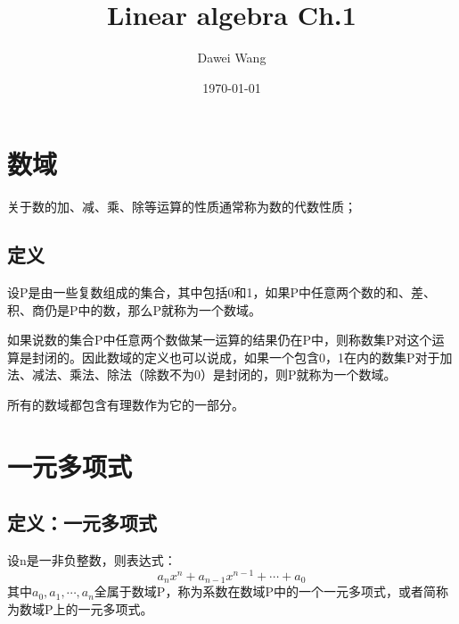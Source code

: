 \documentclass{article}%
\title{Linear algebra Ch.1}
\author{Dawei Wang}
\date{\today}
\begin{document}
	\maketitle

	
\section{数域}
关于数的加、减、乘、除等运算的性质通常称为数的代数性质；
\subsection{定义}
设P是由一些复数组成的集合，其中包括0和1，如果P中任意两个数的和、差、积、商仍是P中的数，那么P就称为一个数域。
\\ \hspace*{\fill} 

如果说数的集合P中任意两个数做某一运算的结果仍在P中，则称数集P对这个运算是封闭的。因此数域的定义也可以说成，如果一个包含0，1在内的数集P对于加法、减法、乘法、除法（除数不为0）是封闭的，则P就称为一个数域。
\\ \hspace*{\fill} 

所有的数域都包含有理数作为它的一部分。

\section{一元多项式}
\subsection{定义：一元多项式}
设n是一非负整数，则表达式：
\begin{equation*}
	a_nx^n+a_{n-1}x^{n-1}+\cdots+a_0
\end{equation*}
其中\(a_0,a_1,\cdots,a_n\)全属于数域P，称为系数在数域P中的一个一元多项式，或者简称为数域P上的一元多项式。
\end{document}
